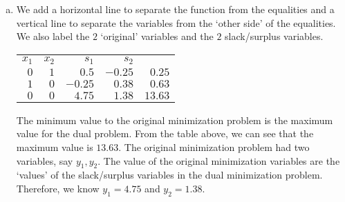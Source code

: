 \documentclass[11pt,letterpaper]{article}
\begin{document}
\begin{enumerate}[(a)]
\item We add a horizontal line to separate the function from the equalities and a vertical line to separate the variables from the `other side' of the equalities. We also label the $2$ `original' variables and the $2$ slack/surplus variables. \par
	\begin{table}[H]
	\centering
	\begin{tabular}{rrrrr}
	{\footnotesize $x_1$} & {\footnotesize $x_2$} & {\footnotesize $s_1$} & {\footnotesize $s_2$} & \\ 
	$0$ & $1$ & $0.5$ & \multicolumn{1}{r|}{$-0.25$} & $0.25$ \\
	$1$ & $0$ & $-0.25$ & \multicolumn{1}{r|}{$0.38$} & $0.63$ \\ \hline
	$0$ & $0$ & $4.75$ & \multicolumn{1}{r|}{$1.38$} & $13.63$
	\end{tabular}
	\end{table} \par
The minimum value to the original minimization problem is the maximum value for the dual problem. From the table above, we can see that the maximum value is $13.63$. The original minimization problem had two variables, say $y_1, y_2$. The value of the original minimization variables are the `values' of the slack/surplus variables in the dual minimization problem. Therefore, we know $y_1= 4.75$ and $y_2= 1.38$. 
\end{enumerate}
\end{document}
